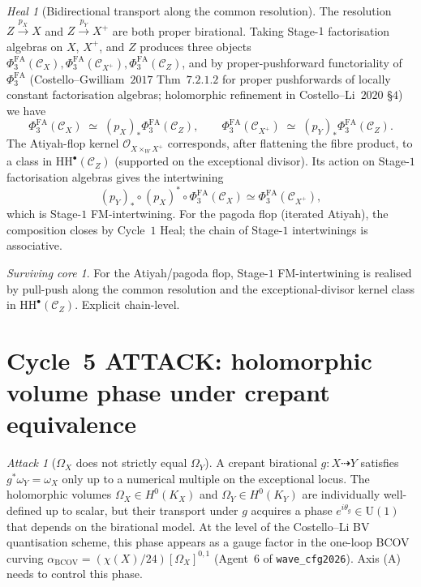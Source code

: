 \documentclass[11pt]{article}
\theoremstyle{definition}
\theoremstyle{remark}
\newtheorem{attack}[theorem]{Attack}
\newtheorem{heal}[theorem]{Heal}
\newtheorem{survivor}[theorem]{Surviving core}
\providecommand{\PhiFA}{\Phi^{\mathrm{FA}}}
\providecommand{\cC}{\mathcal{C}}
\providecommand{\cO}{\mathcal{O}}
\providecommand{\HH}{\mathrm{HH}}
\begin{document}
\begin{heal}[Bidirectional transport along the common resolution]
\label{heal:a-cycle-4}
The resolution $Z \xrightarrow{p_X} X$ and $Z \xrightarrow{p_Y} X^+$
are both proper birational. Taking Stage-$1$ factorisation algebras
on $X$, $X^+$, and $Z$ produces three objects
$\PhiFA_3(\cC_X), \PhiFA_3(\cC_{X^+}), \PhiFA_3(\cC_Z)$, and by
proper-pushforward functoriality of $\PhiFA_3$ (Costello--Gwilliam~$2017$
Thm~$7.2.1.2$ for proper pushforwards of locally constant
factorisation algebras; holomorphic refinement in Costello--Li~$2020$
\S$4$) we have
\[
 \PhiFA_3(\cC_X) \;\simeq\; (p_X)_* \PhiFA_3(\cC_Z), \qquad
 \PhiFA_3(\cC_{X^+}) \;\simeq\; (p_Y)_* \PhiFA_3(\cC_Z).
\]
The Atiyah-flop kernel $\cO_{X \times_W X^+}$ corresponds, after
flattening the fibre product, to a class in
$\HH^\bullet(\cC_Z)$ (supported on the exceptional divisor). Its
action on Stage-$1$ factorisation algebras gives the intertwining
\[
 (p_Y)_* \circ (p_X)^* \circ \PhiFA_3(\cC_X) \simeq \PhiFA_3(\cC_{X^+}),
\]
which is Stage-$1$ FM-intertwining.
For the pagoda flop (iterated Atiyah), the composition closes by
Cycle~$1$ Heal; the chain of Stage-$1$ intertwinings is associative.
\end{heal}

\begin{survivor}
For the Atiyah/pagoda flop, Stage-$1$ FM-intertwining is realised by
pull-push along the common resolution and the exceptional-divisor
kernel class in $\HH^\bullet(\cC_Z)$. Explicit chain-level.
\end{survivor}

\section{Cycle~5 ATTACK: holomorphic volume phase under crepant equivalence}

\begin{attack}[$\Omega_X$ does not strictly equal $\Omega_Y$]
\label{att:a-cycle-5}
A crepant birational $g \colon X \dashrightarrow Y$ satisfies
$g^*\omega_Y = \omega_X$ only up to a numerical multiple on the
exceptional locus. The holomorphic volumes $\Omega_X \in H^0(K_X)$
and $\Omega_Y \in H^0(K_Y)$ are individually well-defined up to
scalar, but their transport under $g$ acquires a phase
$e^{i\theta_g} \in \mathrm{U}(1)$ that depends on the birational
model. At the level of the Costello--Li BV quantisation scheme, this
phase appears as a gauge factor in the one-loop BCOV curving
$\alpha_{\mathrm{BCOV}} = (\chi(X)/24)[\Omega_X]^{0,1}$
(Agent~$6$ of \texttt{wave\_cfg2026}). Axis (A) needs to control this
phase.
\end{attack}
\end{document}
